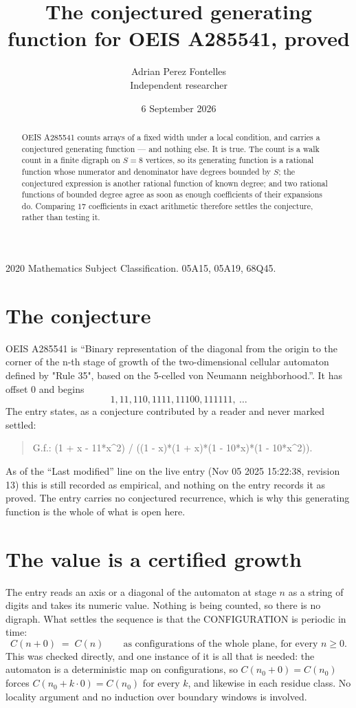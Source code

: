 \documentclass[11pt,a4paper]{article}
\title{The conjectured generating function for OEIS A285541, proved}
\author{Adrian Perez Fontelles\\ \small Independent researcher}
\date{6 September 2026}
\theoremstyle{plain}
\theoremstyle{definition}
\begin{document}
\maketitle

\begin{abstract}
OEIS A285541 counts arrays of a fixed width under a local condition, and carries a conjectured
generating function --- and nothing else. It is true. The count is a walk count in a finite
digraph on $S=8$ vertices, so its generating function is a rational function whose numerator
and denominator have degrees bounded by $S$; the conjectured expression is another rational
function of known degree; and two rational functions of bounded degree agree as soon as enough
coefficients of their expansions do. Comparing $17$ coefficients in exact arithmetic
therefore settles the conjecture, rather than testing it.
\end{abstract}

\noindent\small 2020 Mathematics Subject Classification. 05A15, 05A19, 68Q45.\normalsize

\section{The conjecture}

OEIS A285541 is ``Binary representation of the diagonal from the origin to the corner of the n-th stage of growth of the two-dimensional cellular automaton defined by "Rule 35", based on the 5-celled von Neumann neighborhood.''. It has offset $0$ and begins
\[
1, 11, 110, 1111, 11100, 111111,\ \dots
\]
The entry states, as a conjecture contributed by a reader and never marked settled:
\begin{quote}
G.f.: (1 + x - 11*x\^{}2) / ((1 - x)*(1 + x)*(1 - 10*x)*(1 - 10*x\^{}2)).
\end{quote}
As of the ``Last modified'' line on the live entry (Nov 05 2025 15:22:38, revision 13) this is still
recorded as empirical, and nothing on the entry records it as proved. The entry carries no
conjectured recurrence, which is why this generating function is the whole of what is open
here.


\section{The value is a certified growth}

The entry reads an axis or a diagonal of the automaton at stage $n$ as a string of digits and
takes its numeric value. Nothing is being counted, so there is no digraph. What settles the
sequence is that the CONFIGURATION is periodic in time:
\[
C(n+0)\;=\;C(n)\qquad\text{as configurations of the whole plane, for every } n\ge 0.
\]
This was checked directly, and one instance of it is all that is needed: the automaton is a
deterministic map on configurations, so $C(n_0+0)=C(n_0)$ forces $C(n_0+k\cdot0)=C(n_0)$ for
every $k$, and likewise in each residue class. No locality argument and no induction over
boundary windows is involved.
\end{document}
